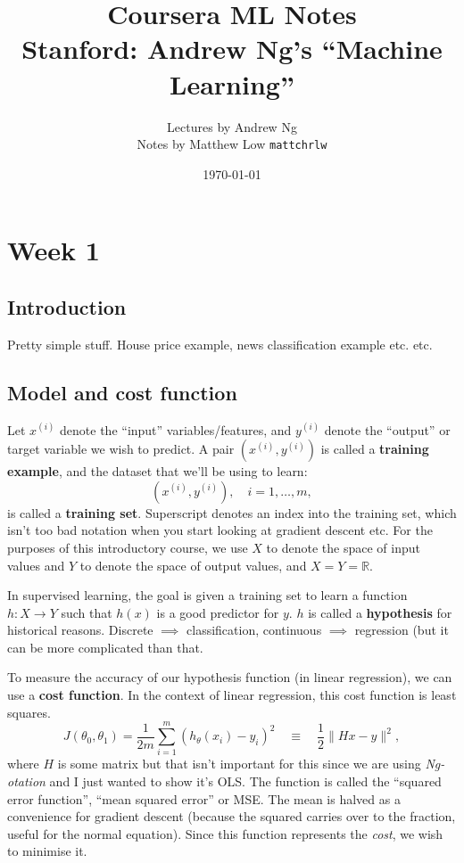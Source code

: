 \documentclass[a4paper, 12pt, oneside]{scrartcl}
\title{Coursera ML Notes\\\large Stanford: Andrew Ng's ``Machine Learning''}
\author{Lectures by Andrew Ng\\Notes by Matthew Low \texttt{mattchrlw}}
\date{\today}
\begin{document}
\maketitle

\tableofcontents

\section{Week 1}

\subsection{Introduction}
Pretty simple stuff. House price example, news classification example etc. etc.

\subsection{Model and cost function}
Let $x^{(i)}$ denote the ``input'' variables/features, and $y^{(i)}$ denote the ``output'' or target variable we wish to predict. A pair $(x^{(i)}, y^{(i)})$ is called a \textbf{training example}, and the dataset that we'll be using to learn:
\[(x^{(i)}, y^{(i)}), \quad i = 1,\ldots, m,\]
is called a \textbf{training set}. Superscript denotes an index into the training set, which isn't too bad notation when you start looking at gradient descent etc. For the purposes of this introductory course, we use $X$ to denote the space of input values and $Y$ to denote the space of output values, and $X = Y = \mathbb R$.

In supervised learning, the goal is given a training set to learn a function $h: X \to Y$ such that $h(x)$ is a good predictor for $y$. $h$ is called a \textbf{hypothesis} for historical reasons. Discrete $\implies$ classification, continuous $\implies$ regression (but it can be more complicated than that.

To measure the accuracy of our hypothesis function (in linear regression), we can use a \textbf{cost function}. In the context of linear regression, this cost function is least squares.
\[J(\theta_0, \theta_1) = \frac{1}{2m} \sum_{i=1}^m (h_\theta(x_i) - y_i)^2 \quad \equiv \quad \frac12 \|Hx - y\|^2,\]
where $H$ is some matrix but that isn't important for this since we are using \textit{Ng-otation} and I just wanted to show it's OLS. The function is called the ``squared error function'', ``mean squared error'' or MSE. The mean is halved as a convenience for gradient descent (because the squared carries over to the fraction, useful for the normal equation). Since this function represents the \textit{cost}, we wish to minimise it.
\end{document}

